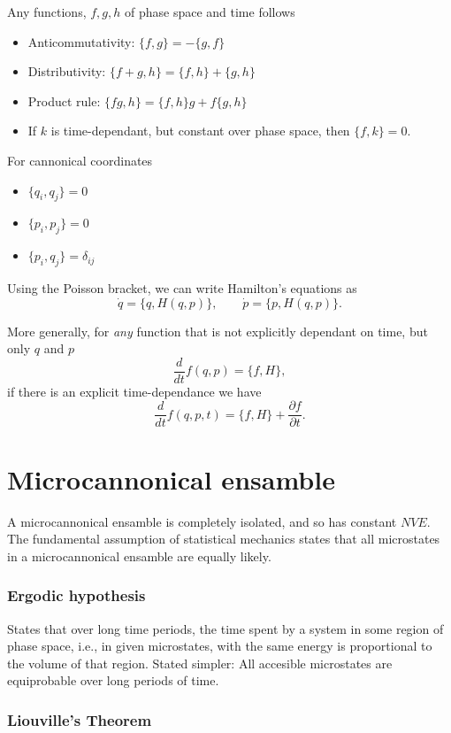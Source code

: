 \documentclass[a4paper, 11pt, notitlepage, english]{article}
\newcommand{\p}{\partial}
\begin{document}
Any functions, $f, g, h$ of phase space and time follows
\begin{itemize}
	\item Anticommutativity: $\{f, g\} = - \{g, f\}$
	\item Distributivity: $\{f+g, h\} = \{f, h\} + \{g, h\}$
	\item Product rule: $\{fg, h\} = \{f, h\}g + f\{g, h\}$
	\item If $k$ is time-dependant, but constant over phase space, then $\{f,k\} = 0$.
\end{itemize}
For cannonical coordinates
\begin{itemize}
	\item $\{q_i, q_j\} = 0$
	\item $\{p_i, p_j\} = 0$
	\item $\{p_i, q_j\} = \delta_{ij}$
\end{itemize}

Using the Poisson bracket, we can write Hamilton's equations as
$$\dot{q} = \{q, H(q,p)\}, \qquad \dot{p} = \{p, H(q,p)\}.$$

More generally, for \emph{any} function that is not explicitly dependant on time, but only $q$ and $p$
$$\frac{d}{dt}f(q,p) = \{f, H\},$$
if there is an explicit time-dependance we have
$$\frac{d}{dt}f(q,p,t) = \{f, H\} + \frac{\p f}{\p t}.$$


\section*{Microcannonical ensamble}
A microcannonical ensamble is completely isolated, and so has constant $NVE$. The fundamental assumption of statistical mechanics states that all microstates in a microcannonical ensamble are equally likely.

\subsubsection*{Ergodic hypothesis}

States that over long time periods, the time spent by a system in some region of phase space, i.e., in given microstates, with the same energy is proportional to the volume of that region. Stated simpler: All accesible microstates are equiprobable over long periods of time.

\subsubsection*{Liouville's Theorem}
\end{document}
